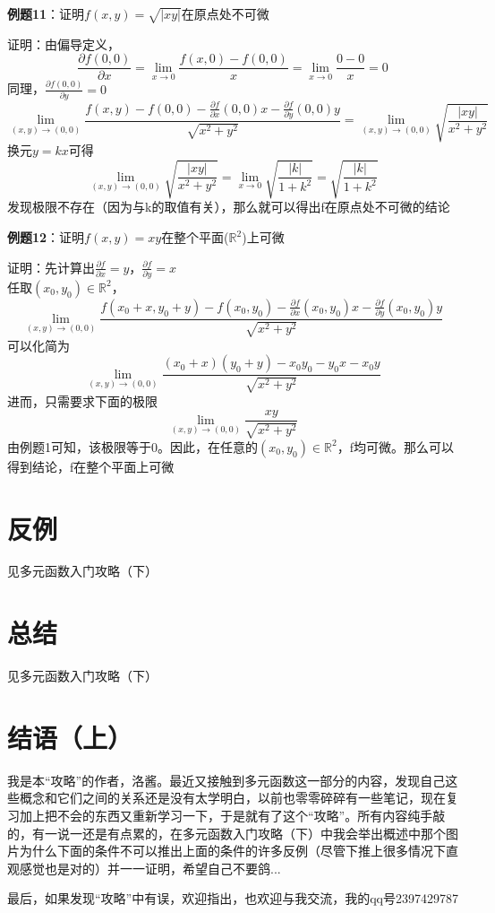 \documentclass{article}
\begin{document}
\textbf{例题11}：证明$f(x,y)=\sqrt{|xy|}$在原点处不可微

证明：由偏导定义，
\[\frac{\partial f(0,0)}{\partial x}=  \lim\limits_{x \rightarrow 0} \frac{f(x,0)-f(0,0)}{x} = \lim\limits_{x \rightarrow 0} \frac{0-0}{x}=0\]
同理，$\frac{\partial f(0,0)}{\partial y}=0$
\[\lim\limits_{(x,y) \rightarrow (0,0)} \frac{ f(x,y)-f(0,0) - \frac{\partial f}{\partial x}(0,0) x - \frac{\partial f}{\partial y}(0,0) y}{ \sqrt{x^2 + y^2} }
=\lim\limits_{(x,y) \rightarrow (0,0)} \sqrt{\frac{|xy|}{x^2+y^2}}\]
换元$y=kx$可得
\[\lim\limits_{(x,y) \rightarrow (0,0)} \sqrt{\frac{|xy|}{x^2+y^2}}=\lim\limits_{x \rightarrow 0} \sqrt{\frac{|k|}{1+k^2}}=\sqrt{\frac{|k|}{1+k^2}}\]
发现极限不存在（因为与k的取值有关），那么就可以得出f在原点处不可微的结论


\textbf{例题12}：证明$f(x,y)=xy$在整个平面($\mathbb{R}^2$)上可微

证明：先计算出$\frac{\partial f}{\partial x} = y$，$\frac{\partial f}{\partial y} = x$\\
任取$(x_0,y_0) \in \mathbb{R}^2$，
\[\lim\limits_{(x,y) \rightarrow (0,0)} \frac{ f(x_0+x,y_0+y)-f(x_0,y_0) - \frac{\partial f}{\partial x}(x_0,y_0) x - \frac{\partial f}{\partial y}(x_0,y_0) y}{ \sqrt{x^2 + y^2} }\]
可以化简为
\[\lim\limits_{(x,y) \rightarrow (0,0)} \frac{ (x_0+x)(y_0+y)-x_0y_0 - y_0 x - x_0 y}{ \sqrt{x^2 + y^2} }\]
进而，只需要求下面的极限
\[\lim\limits_{(x,y) \rightarrow (0,0)} \frac{xy}{ \sqrt{x^2 + y^2} }\]
由例题1可知，该极限等于0。因此，在任意的$(x_0,y_0) \in \mathbb{R}^2$，f均可微。那么可以得到结论，f在整个平面上可微

\section{反例}
见多元函数入门攻略（下）

\section{总结}
见多元函数入门攻略（下）

\section{结语（上）}
我是本“攻略”的作者，洛酱。最近又接触到多元函数这一部分的内容，发现自己这些概念和它们之间的关系还是没有太学明白，以前也零零碎碎有一些笔记，现在复习加上把不会的东西又重新学习一下，于是就有了这个“攻略”。所有内容纯手敲的，有一说一还是有点累的，在多元函数入门攻略（下）中我会举出概述中那个图片为什么下面的条件不可以推出上面的条件的许多反例（尽管下推上很多情况下直观感觉也是对的）并一一证明，希望自己不要鸽...

最后，如果发现“攻略”中有误，欢迎指出，也欢迎与我交流，我的qq号2397429787
\end{document}
